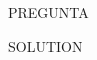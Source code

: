 \question[20] PREGUNTA

\noaddpoints
\begin{parts}
\part[10]
\part[10]
\end{parts}

\begin{solution}
SOLUTION

\end{solution}


